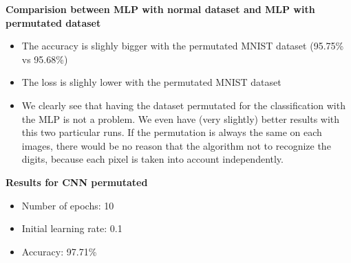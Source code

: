 \documentclass[10pt,a4paper,fullpage]{article}
\begin{document}
\textbf{Comparision between MLP with normal dataset and MLP with permutated dataset}
\begin{itemize}
	\item The accuracy is slighly bigger with the permutated MNIST dataset (95.75\% vs 95.68\%)
	\item The loss is slighly lower with the permutated MNIST dataset
	\item We clearly see that having the dataset permutated for the classification with the MLP is not a problem. We even have (very slightly) better results with this two particular runs. If the permutation is always the same on each images, there would be no reason that the algorithm not to recognize the digits, because each pixel is taken into account independently.
\end{itemize}
\hfill \break

\textbf{Results for CNN permutated}
\begin{itemize}
	\item Number of epochs: 10
	\item Initial learning rate: 0.1
	\item Accuracy: 97.71\%
\end{itemize}
\end{document}
